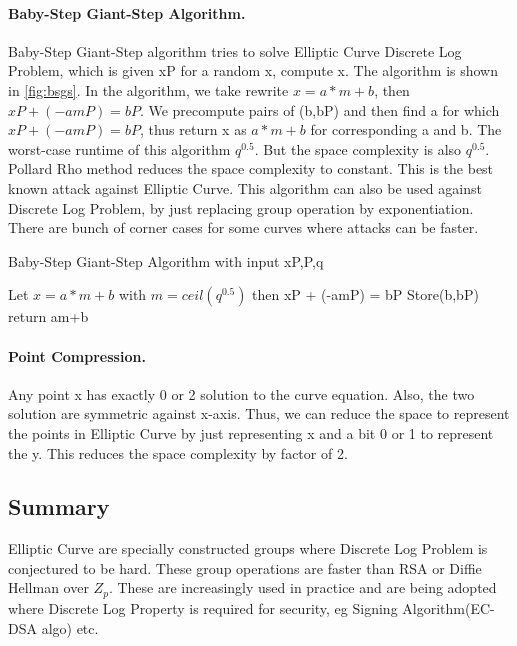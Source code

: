 \paragraph{Baby-Step Giant-Step Algorithm.} Baby-Step Giant-Step algorithm tries to solve Elliptic Curve Discrete Log Problem, which is given xP for a random x, compute x. The algorithm is shown in \ref{fig:bsgs}. In the algorithm, we take rewrite $x = a*m+b$, then $xP + (-amP) = bP$. We precompute pairs of (b,bP) and then find a for which $xP + (-amP) = bP$, thus return x as $a*m+b$ for corresponding a and b. The worst-case runtime of this algorithm $q^{0.5}$. But the space complexity is also $q^{0.5}$. Pollard Rho method reduces the space complexity to constant. This is the best known attack against Elliptic Curve. This algorithm can also be used against Discrete Log Problem, by just replacing group operation by exponentiation. There are bunch of corner cases for some curves where attacks can be faster.


\begin{algorithm}
\caption{Baby-Step Giant-Step Algorithm with input xP,P,q }\label{fig:bsg}
\begin{algorithmic}[1]
\State Let $x = a*m+b$ with $m = ceil(q^{0.5})$ then
\State xP + (-amP) = bP
\State Store(b,bP)
\EndFor
{}
\State return am+b
\EndIf
\EndFor
\EndProcedure
\end{algorithmic}
\end{algorithm}

\paragraph{Point Compression.} Any point x has exactly 0 or 2 solution to the curve equation. Also, the two solution are symmetric against x-axis. Thus, we can reduce the space to represent the points in Elliptic Curve by just representing x and a bit 0 or 1 to represent the y. This reduces the space complexity by factor of 2.

\subsection{Summary}
Elliptic Curve are specially constructed groups where Discrete Log Problem is conjectured to be hard. These group operations are faster than RSA or Diffie Hellman over $Z_p$. These are increasingly used in practice and are being adopted where Discrete Log Property is required for security, eg Signing Algorithm(EC-DSA algo) etc.
